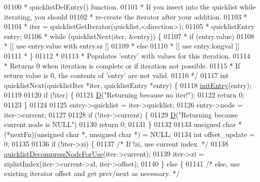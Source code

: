 \begin{DoxyCode}
{{{{{{{{01100 \textcolor{comment}{ * quicklistDelEntry() function.}
01101 \textcolor{comment}{ * If you insert into the quicklist while iterating, you should}
01102 \textcolor{comment}{ * re-create the iterator after your addition.}
01103 \textcolor{comment}{ *}
01104 \textcolor{comment}{ * iter = quicklistGetIterator(quicklist,<direction>);}
01105 \textcolor{comment}{ * quicklistEntry entry;}
01106 \textcolor{comment}{ * while (quicklistNext(iter, &entry)) \{}
01107 \textcolor{comment}{ *     if (entry.value)}
01108 \textcolor{comment}{ *          [[ use entry.value with entry.sz ]]}
01109 \textcolor{comment}{ *     else}
01110 \textcolor{comment}{ *          [[ use entry.longval ]]}
01111 \textcolor{comment}{ * \}}
01112 \textcolor{comment}{ *}
01113 \textcolor{comment}{ * Populates 'entry' with values for this iteration.}
01114 \textcolor{comment}{ * Returns 0 when iteration is complete or if iteration not possible.}
01115 \textcolor{comment}{ * If return value is 0, the contents of 'entry' are not valid.}
01116 \textcolor{comment}{ */}
01117 \textcolor{keywordtype}{int} quicklistNext(quicklistIter *iter, quicklistEntry *entry) \{
01118     \hyperlink{quicklist_8c_abe57c7a46b2e8ec8e138de8cbe5e660a}{initEntry}(entry);
01119 
01120     \textcolor{keywordflow}{if} (!iter) \{
01121         \hyperlink{debugmacro_8h_a74021f021dcdfbb22891787b79c5529d}{D}(\textcolor{stringliteral}{"Returning because no iter!"});
01122         \textcolor{keywordflow}{return} 0;
01123     \}
01124 
01125     entry->quicklist = iter->quicklist;
01126     entry->node = iter->current;
01127 
01128     \textcolor{keywordflow}{if} (!iter->current) \{
01129         \hyperlink{debugmacro_8h_a74021f021dcdfbb22891787b79c5529d}{D}(\textcolor{stringliteral}{"Returning because current node is NULL"})
01130         \textcolor{keywordflow}{return} 0;
01131     \}
01132 
01133     \textcolor{keywordtype}{unsigned} \textcolor{keywordtype}{char} *(*nextFn)(\textcolor{keywordtype}{unsigned} \textcolor{keywordtype}{char} *, \textcolor{keywordtype}{unsigned} \textcolor{keywordtype}{char} *) = NULL;
01134     \textcolor{keywordtype}{int} offset\_update = 0;
01135 
01136     \textcolor{keywordflow}{if} (!iter->zi) \{
01137         \textcolor{comment}{/* If !zi, use current index. */}
01138         \hyperlink{quicklist_8c_a2f30e6f482d51059f06fa34df69734e1}{quicklistDecompressNodeForUse}(iter->current);
01139         iter->zi = ziplistIndex(iter->current->zl, iter->offset);
01140     \} \textcolor{keywordflow}{else} \{
01141         \textcolor{comment}{/* else, use existing iterator offset and get prev/next as necessary. */}
}}}}}}}}
\end{DoxyCode}
